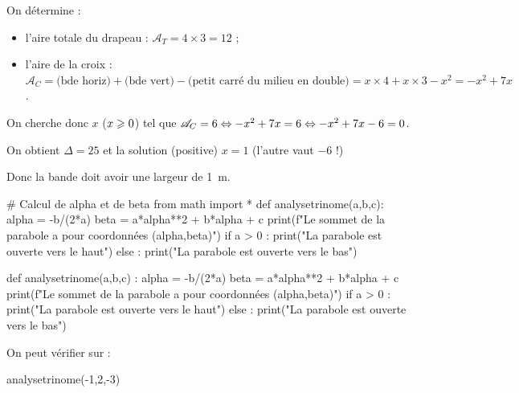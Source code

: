 \documentclass[a4paper,11pt]{article}
\begin{document}

\medskip

On détermine :
\begin{itemize}
	\item l'aire totale du drapeau : $\mathscr{A}_T=4 \times 3=12$ ;
	\item l'aire de la croix : $\mathscr{A}_C = \text{(bde horiz)} + \text{(bde vert)} - \text{(petit carré du milieu en double)} = x \times 4 + x \times 3 - x^2 = -x^2+7x$. 
\end{itemize}
On cherche donc $x$ ($x\geqslant 0$) tel que $\mathscr{A}_C = 6 \Leftrightarrow -x^2+7x = 6 \Leftrightarrow -x^2+7x-6=0$.

On obtient $\Delta = 25$ et la solution (positive) $x=1$ (l'autre vaut $-6$ !)

Donc la bande doit avoir une largeur de 1~m.

\medskip


\begin{pyconcode}
# Calcul de alpha et de beta
from math import *
def analysetrinome(a,b,c):
	alpha = -b/(2*a)
	beta = a*alpha**2 + b*alpha + c
	print(f"Le sommet de la parabole a pour coordonnées ({alpha},{beta})")
	if a > 0 :
		print("La parabole est ouverte vers le haut")
	else :
		print("La parabole est ouverte vers le bas")

\end{pyconcode}

\begin{tcpythoncodeno}[15cm]
	\begin{pyverbatim}[][fontsize=\footnotesize,numbers=none]
		def analysetrinome(a,b,c) :
			alpha = -b/(2*a)
			beta = a*alpha**2 + b*alpha + c
			print(f"Le sommet de la parabole a pour coordonnées ({alpha},{beta})")
			if a > 0 :
				print("La parabole est ouverte vers le haut")
			else :
				print("La parabole est ouverte vers le bas")
	\end{pyverbatim}
\end{tcpythoncodeno}

On peut vérifier sur  :

\begin{consolepython}[15cm]
\begin{pyconsole}[][framesep=3mm,frame=single,label={[\scriptsize Début de la console \logopython]\scriptsize Fin de la console \logopython},fontsize=\footnotesize,framerule=1pt,rulecolor=\color{ForestGreen}]
analysetrinome(-1,2,-3)
\end{pyconsole}
\end{consolepython}
\end{document}
